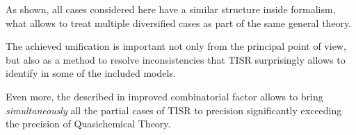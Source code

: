 \documentclass[12pt,abstract]{scrartcl}
\begin{document}
As shown, all cases considered here have a similar  structure inside formalism, what allows to treat multiple diversified cases as part of the same general theory.

The achieved unification is important not only from the principal point of view, but also as a method to  resolve inconsistencies that TISR surprisingly allows to identify in some of the included models.

Even more, the described in \cite{TISR_p4} improved combinatorial factor allows to bring \textit{simultaneously} all the partial cases of TISR to precision significantly exceeding the precision of Quasichemical Theory.








\end{document}
